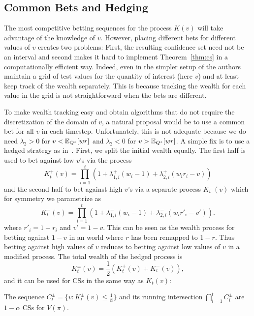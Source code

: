 \subsection{Common Bets and Hedging}
\label{sec:hedged}
The most competitive betting sequences for the process $K(v)$ will take
advantage of the knowledge of $v$. However, placing different bets for
different values of $v$ creates two problems: First, the resulting confidence
set need not be an interval and second makes it hard to implement
Theorem~\ref{thm:cs} in a computationally efficient way.  Indeed, even in the
simpler setup of \citet{waudby-smith_variance-adaptive_2020} the authors
maintain a grid of test values for the quantity of interest (here $v$)  and at
least keep track of the wealth separately.  This is because tracking the wealth
for each value in the grid is not straightforward when the bets are different. 

To make wealth tracking easy and obtain algorithms that do not require the
discretization of the domain of $v$, a natural proposal would be to use a
common bet for all $v$ in each timestep. Unfortunately, this is not adequate
because we do need $\lambda_2 > 0$ for $v<\mathbb{E}_{Q^*}[wr]$ and $\lambda_2 < 0$ for
$v>\mathbb{E}_{Q^*}[wr]$.  A simple fix is to use a hedged strategy as
in~\citet{waudby-smith_variance-adaptive_2020}.  First, we split the initial
wealth equally.  The first half is used to bet against low $v$'s via the process
\[
K_t^{+}(v) = \prod_{i=1}^t \left(1+\lambda_{1,i}^{+}(w_i-1)+\lambda_{2,i}^{+}(w_i r_i -v)\right)
\]
and the second half to bet against high $v$'s via a separate process
$K_t^{-}(v)$ which for symmetry we parametrize as
\[
K_t^{-}(v) = \prod_{i=1}^t \left(1+\lambda_{1,i}^{-}(w_i-1)+\lambda_{2,i}^{-}(w_i r'_i -v')\right).
\]
where $r'_i=1-r_i$ and $v'=1-v$.  This can be seen as the wealth process for
betting against $1-v$ in an world where $r$ has been remapped to $1-r$.  Thus
betting against high values of $v$ reduces to betting against low values of $v$
in a modified process. The total wealth of the hedged process is
\begin{equation}
K_t^{\pm}(v) = \frac{1}{2} (K_t^{+}(v) + K_t^{-}(v)),
\label{eq:hedged}
\end{equation}
and it can be used for CSs in the same way as $K_t(v)$:
\begin{theorem}
\label{thm:hedged}
The sequence $C_t^{\pm} = \{v:K_t^{\pm}(v)\leq \frac{1}{\alpha}\}$ and its 
running intersection $\bigcap_{i=1}^t C_i^{\pm}$
are $1-\alpha$ CSs for $V(\pi)$.
\end{theorem}

